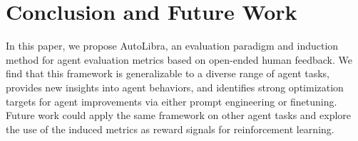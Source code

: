 \section{Conclusion and Future Work}
In this paper, we propose AutoLibra, an evaluation paradigm and induction method for agent evaluation metrics based on open-ended human feedback.
We find that this framework is generalizable to a diverse range of agent tasks, provides new insights into agent behaviors,
and identifies strong optimization targets for agent improvements via either prompt engineering or finetuning.
Future work could apply the same framework on other agent tasks and explore the use of the induced metrics as reward signals for reinforcement learning.
